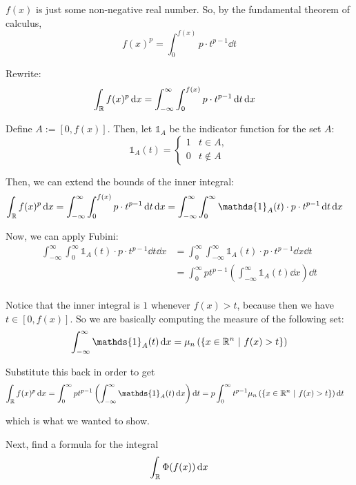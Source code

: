 \documentclass[12pt]{article}
\begin{document}
$f(x)$ is just some non-negative real number. So, by the fundamental theorem of calculus,
$$
    f(x)^p = \int_{0}^{f(x)} p \cdot t^{p-1} \dd t
$$

Rewrite:
$$
\begin{aligned}
    \int_{\mathbb{R}} f(x)^p \mathop{}\!\mathrm{d} x &= \int_{-\infty}^{\infty} \int_{0}^{f(x)} p \cdot t^{p-1} \mathop{}\!\mathrm{d} t \mathop{}\!\mathrm{d} x
\end{aligned}
$$

Define $A := [0, f(x)]$. Then, let $\mathds{1}_A$ be the indicator function for the set $A$:
$$
    \mathds{1}_A(t) = 
    \begin{cases}
        1 & t \in A, \\
        0 & t \notin A
    \end{cases}
$$

Then, we can extend the bounds of the inner integral:
$$
\begin{aligned}
    \int_\R f(x)^p \dd x &= \int_{-\infty}^{\infty} \int_{0}^{f(x)} p \cdot t^{p-1} \dd t \dd x = \int_{-\infty}^{\infty} \int_{0}^{\infty} \mathds{1}_A(t) \cdot p \cdot t^{p-1} \dd t \dd x
\end{aligned}
$$

Now, we can apply Fubini:
$$
\begin{aligned}
    \int_{-\infty}^{\infty} \int_{0}^{\infty} \mathds{1}_A(t) \cdot p \cdot t^{p-1} \dd t \dd x &= \int_{0}^{\infty} \int_{-\infty}^{\infty} \mathds{1}_A(t) \cdot p \cdot t^{p-1} \dd x \dd t \\
    &= \int_{0}^{\infty} p t^{p-1} \left( \int_{-\infty}^{\infty} \mathds{1}_A(t) \dd x \right) \dd t \\
\end{aligned}
$$

Notice that the inner integral is $1$ whenever $f(x) > t$, because then we have $t \in [0, f(x)]$. So we are basically computing the measure of the following set:
$$
    \int_{-\infty}^{\infty} \mathds{1}_A(t) \dd x = \mu_n\left(\left\{x \in \R^n \ |\ f(x) > t\right\}\right)
$$

Substitute this back in order to get
$$
\begin{aligned}
    \int_\R f(x)^p \dd x &= \int_{0}^{\infty} p t^{p-1} \left( \int_{-\infty}^{\infty} \mathds{1}_A(t) \dd x \right) \dd t = p \int_{0}^{\infty} t^{p-1} \mu_n\left(\left\{x \in \R^n \ |\ f(x) > t\right\}\right) \dd t
\end{aligned}
$$

which is what we wanted to show.

Next, find a formula for the integral
$$
    \int_{\mathbb{R}} \Phi(f(x)) \mathop{}\!\mathrm{d} x
$$
\end{document}
